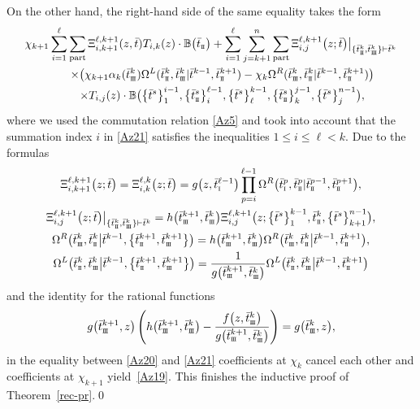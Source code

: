 \documentclass[10pt,a4paper]{amsart}
\newcommand{\so}{\scriptscriptstyle \rm I}
\newcommand{\st}{\scriptscriptstyle \rm I\hspace{-1pt}I}
\newcommand{\sth}{\scriptscriptstyle \rm I\hspace{-1pt}I\hspace{-1pt}I}
\newcommand{\bt}{{\bar t}}
\theoremstyle{definition}
\def\BB{{\mathbb{B}}}
\def\r#1{\eqref{#1}}
\def\vk{\chi}
\def\Oml{\Omega^L}
\def\Omr{\Omega^R}
\begin{document}
On the other hand, the right-hand side of the same equality takes the form
\begin{gather}
\vk_{k+1} \sum_{i=1}^\ell\sum_{\rm part}\Xi^{\ell,k+1}_{i,k+1}(z,\bt) T_{i,k}(z)\cdot \BB\bigl(\bt_{\st}\bigr)+
\sum_{i=1}^\ell\sum_{j=k+1}^n\sum_{\rm part} \Xi^{\ell,k+1}_{i,j}\bigl(z;\bt\bigr)
\big|_{\{\bt^k_{\st},\bt^k_{\sth}\}\vdash\bt^k}\nonumber\\
\qquad\times
\bigl(\vk_{k+1} \alpha_k(\bt^k_{\sth})
\Oml(\bt^k_{\st},\bt^k_{\sth}|\bt^{k-1},\bt^{k+1}_{\st})
-\vk_k \Omr(\bt^k_{\sth},\bt^k_{\st}|\bt^{k-1},\bt^{k+1}_{\st})\bigr)\nonumber\\
\qquad\times
T_{i,j}(z)\cdot\BB\bigl(\bigl\{\bt^s\bigr\}_{1}^{i-1},\bigl\{\bt^s_{\st}\bigr\}_{i}^{\ell-1},\bigl\{\bt^s\bigr\}_{\ell}^{k-1},
\bigl\{\bt^s_{\st}\bigr\}_{k}^{j-1},\bigl\{\bt^s\bigr\}_{j}^{n-1}\bigr) ,\label{Az21}
\end{gather}
where we used the commutation relation \r{Az5} and took into account that
the summation index $i$ in \r{Az21} satisfies the inequalities $1\leq i\leq \ell< k$.
Due to the formulas
\begin{gather*}
\Xi^{\ell,k+1}_{i,k+1}\bigl(z;\bt\bigr)=\Xi^{\ell,k}_{i,k}\bigl(z;\bt\bigr)=g\bigl(z,\bt^{\ell-1}_{\so}\bigr)
\prod_{p=i}^{\ell-1}\Omr\bigl(\bt^{p}_{\so},\bt^{p}_{\st}|\bt^{p-1}_{\st},\bt^{p+1}_{\st}\bigr) ,\\
\Xi^{\ell,k+1}_{i,j}\bigl(z;\bt\bigr)
\big|_{\{\bt^k_{\st},\bt^k_{\sth}\}\vdash\bt^k}=
h\bigl(\bt^{k+1}_{\sth},\bt^k_{\sth}\bigr)
\Xi^{\ell,k+1}_{i,j}\bigl(z;\bigl\{\bt^s\bigr\}_{1}^{k-1},
\bt^k_{\st},\bigl\{\bt^s\bigr\}_{k+1}^{n-1}\bigr),
\\
\Omr\bigl(\bt^{k}_{\sth},\bt^{k}_{\st}\big|\bt^{k-1},\bigl\{\bt^{k+1}_{\st},\bt^{k+1}_{\sth}\bigr\}\bigr) =
h\bigl(\bt^{k+1}_{\sth},\bt^k_{\sth}\bigr)
\Omr\bigl(\bt^{k}_{\sth},\bt^{k}_{\st}\big|\bt^{k-1},\bt^{k+1}_{\st}\bigr) ,
\\
\Oml\bigl(\bt^{k}_{\st},\bt^{k}_{\sth}\big|\bt^{k-1},\bigl\{\bt^{k+1}_{\st},\bt^{k+1}_{\sth}\bigr\}\bigr) =
\frac{1}{g\bigl(\bt^{k+1}_{\sth},\bt^k_{\sth}\bigr)}
\Oml\bigl(\bt^{k}_{\st},\bt^{k}_{\sth}\big|\bt^{k-1},\bt^{k+1}_{\st}\bigr)
\end{gather*}
and the identity for the rational functions
\begin{equation*}
g\bigl(\bt^{k+1}_{\sth},z\bigr)\left(h\bigl(\bt^{k+1}_{\sth},\bt^k_{\sth}\bigr)-
\frac{f\bigl(z,\bt^k_{\sth}\bigr)}{g\bigl(\bt^{k+1}_{\sth},\bt^k_{\sth}\bigr)}\right)=g\bigl(\bt^k_{\sth},z\bigr),
\end{equation*}
in the equality between \r{Az20} and \r{Az21} coefficients at $\vk_k$ cancel each other and coefficients at $\vk_{k+1}$ yield~\r{Az19}.
This finishes the inductive proof of Theorem~\ref{rec-pr}.\qed
\end{document}
